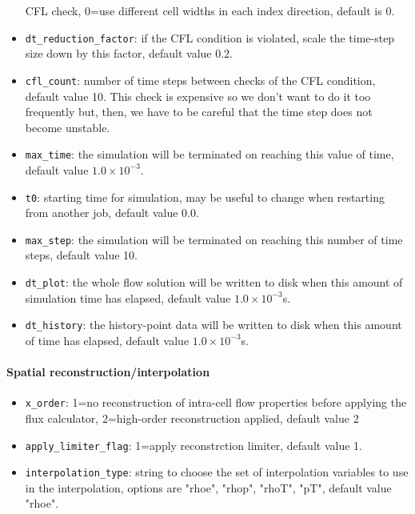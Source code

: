 \documentclass[12pt,a4paper,twoside]{article}
\begin{document}
\begin{itemize}
  CFL check, 0=use different cell widths in each index direction, default is 0.
\item \texttt{dt\_reduction\_factor}\ddag: if the CFL condition is violated, scale the time-step size
  down by this factor, default value 0.2.
\item \texttt{cfl\_count}: number of time steps between checks of the CFL
  condition, default value 10.
  This check is expensive so we don't want to do it too frequently but, then,
  we have to be careful that the time step does not become unstable.
\item \texttt{max\_time}\ddag: the simulation will be terminated on reaching this
  value of time, default value $1.0 \times 10^{-3}$.
\item \texttt{t0}: starting time for simulation, may be useful to change when restarting from another job,
  default value 0.0.
\item \texttt{max\_step}\ddag: the simulation will be terminated on reaching this
  number of time steps, default value 10.
\item \texttt{dt\_plot}\ddag: the whole flow solution will be written to disk when
  this amount of simulation time has elapsed, default value $1.0 \times 10^{-3}$s.
\item \texttt{dt\_history}\ddag: the history-point data will be written to disk
  when this amount of time has elapsed, default value $1.0 \times 10^{-3}$s.
\end{itemize}

\paragraph{Spatial reconstruction/interpolation}
\begin{itemize}
\item \texttt{x\_order}\ddag: 1=no reconstruction of intra-cell flow properties
  before applying the flux calculator, 2=high-order reconstruction applied, 
  default value 2
\item \texttt{apply\_limiter\_flag}: 1=apply reconstrction limiter, default value 1.
\item \texttt{interpolation\_type}: string to choose the set of interpolation variables
  to use in the interpolation, options are "rhoe", "rhop", "rhoT", "pT", default value "rhoe".
\end{itemize}
\end{document}
